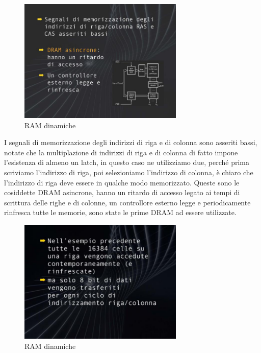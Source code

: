 \FloatBarrier
\begin{figure}[H]
  \centering
  \includegraphics[width=0.70\textwidth,
                    trim=40 30 20 40, %
                    clip]
                    {images/Lez04_p05_fig_01.png}
  \caption{RAM dinamiche}
  \label{fig:Lez04_p05_fig_01}
\end{figure}
\FloatBarrier
\noindent

I segnali di memorizzazione degli indirizzi di riga e di colonna sono asseriti bassi, notate che la multiplazione di indirizzi di riga e di colonna di fatto impone l'esistenza di almeno un latch, in questo caso ne utilizziamo due, perché prima scriviamo l'indirizzo di riga, poi selezioniamo l'indirizzo di colonna, è chiaro che l'indirizzo di riga deve essere in qualche modo memorizzato.
Queste sono le cosiddette DRAM asincrone, hanno un ritardo di accesso legato ai tempi di scrittura delle righe e di colonne, un controllore esterno legge e periodicamente rinfresca tutte le memorie, sono state le prime DRAM ad essere utilizzate.

\FloatBarrier
\begin{figure}[H]
  \centering
  \includegraphics[width=0.70\textwidth,
                    trim=40 30 20 40, %
                    clip]
                    {images/Lez04_p05_fig_02.png}
  \caption{RAM dinamiche}
  \label{fig:Lez04_p05_fig_02}
\end{figure}
\FloatBarrier
\noindent


